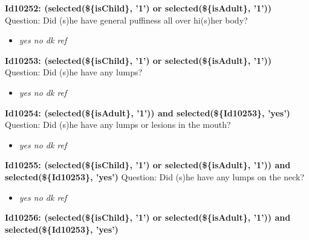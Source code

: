 \documentclass{article}%
\begin{document}
\textbf{Id10252: (selected(\$\{isChild\}, '1') or selected(\$\{isAdult\}, '1'))\newline%
}%
Question: Did (s)he have general puffiness all over hi(s)her body?\newline%
%
\begin{itemize}%
\item%
\textit{yes\newline%
 no\newline%
 dk\newline%
 ref\newline%
}%
\end{itemize}%
\textbf{Id10253: (selected(\$\{isChild\}, '1') or selected(\$\{isAdult\}, '1'))\newline%
}%
Question: Did (s)he have any lumps?\newline%
%
\begin{itemize}%
\item%
\textit{yes\newline%
 no\newline%
 dk\newline%
 ref\newline%
}%
\end{itemize}%
\textbf{Id10254: (selected(\$\{isAdult\}, '1')) and selected(\$\{Id10253\}, 'yes')\newline%
}%
Question: Did (s)he have any lumps or lesions in the mouth?\newline%
%
\begin{itemize}%
\item%
\textit{yes\newline%
 no\newline%
 dk\newline%
 ref\newline%
}%
\end{itemize}%
\textbf{Id10255: (selected(\$\{isChild\}, '1') or selected(\$\{isAdult\}, '1')) and selected(\$\{Id10253\}, 'yes')\newline%
}%
Question: Did (s)he have any lumps on the neck?\newline%
%
\begin{itemize}%
\item%
\textit{yes\newline%
 no\newline%
 dk\newline%
 ref\newline%
}%
\end{itemize}%
\textbf{Id10256: (selected(\$\{isChild\}, '1') or selected(\$\{isAdult\}, '1')) and selected(\$\{Id10253\}, 'yes')\newline%
}%
\end{document}
